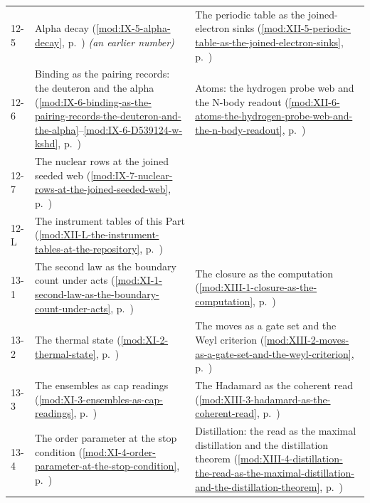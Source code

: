 {\begin{longtable}{p{11mm}p{70mm}p{60mm}}
12-5 & Alpha decay (\ref{mod:IX-5-alpha-decay}, p.~\pageref{mod:IX-5-alpha-decay}) \emph{(an earlier number)} & The periodic table as the joined-electron sinks (\ref{mod:XII-5-periodic-table-as-the-joined-electron-sinks}, p.~\pageref{mod:XII-5-periodic-table-as-the-joined-electron-sinks}) \\
12-6 & Binding as the pairing records: the deuteron and the alpha (\ref{mod:IX-6-binding-as-the-pairing-records-the-deuteron-and-the-alpha}--\ref{mod:IX-6-D539124-w-kshd}, p.~\pageref{mod:IX-6-binding-as-the-pairing-records-the-deuteron-and-the-alpha}) & Atoms: the hydrogen probe web and the N-body readout (\ref{mod:XII-6-atoms-the-hydrogen-probe-web-and-the-n-body-readout}, p.~\pageref{mod:XII-6-atoms-the-hydrogen-probe-web-and-the-n-body-readout}) \\
12-7 & The nuclear rows at the joined seeded web (\ref{mod:IX-7-nuclear-rows-at-the-joined-seeded-web}, p.~\pageref{mod:IX-7-nuclear-rows-at-the-joined-seeded-web}) &  \\
12-L & The instrument tables of this Part (\ref{mod:XII-L-the-instrument-tables-at-the-repository}, p.~\pageref{mod:XII-L-the-instrument-tables-at-the-repository}) &  \\
13-1 & The second law as the boundary count under acts (\ref{mod:XI-1-second-law-as-the-boundary-count-under-acts}, p.~\pageref{mod:XI-1-second-law-as-the-boundary-count-under-acts}) & The closure as the computation (\ref{mod:XIII-1-closure-as-the-computation}, p.~\pageref{mod:XIII-1-closure-as-the-computation}) \\
13-2 & The thermal state (\ref{mod:XI-2-thermal-state}, p.~\pageref{mod:XI-2-thermal-state}) & The moves as a gate set and the Weyl criterion (\ref{mod:XIII-2-moves-as-a-gate-set-and-the-weyl-criterion}, p.~\pageref{mod:XIII-2-moves-as-a-gate-set-and-the-weyl-criterion}) \\
13-3 & The ensembles as cap readings (\ref{mod:XI-3-ensembles-as-cap-readings}, p.~\pageref{mod:XI-3-ensembles-as-cap-readings}) & The Hadamard as the coherent read (\ref{mod:XIII-3-hadamard-as-the-coherent-read}, p.~\pageref{mod:XIII-3-hadamard-as-the-coherent-read}) \\
13-4 & The order parameter at the stop condition (\ref{mod:XI-4-order-parameter-at-the-stop-condition}, p.~\pageref{mod:XI-4-order-parameter-at-the-stop-condition}) & Distillation: the read as the maximal distillation and the distillation theorem (\ref{mod:XIII-4-distillation-the-read-as-the-maximal-distillation-and-the-distillation-theorem}, p.~\pageref{mod:XIII-4-distillation-the-read-as-the-maximal-distillation-and-the-distillation-theorem}) \\

\end{longtable}}
